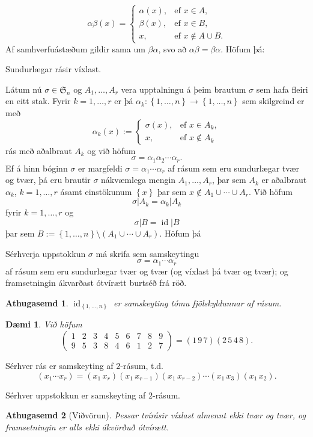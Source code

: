 \documentclass[a4paper,icelandic,11pt]{book}
\theoremstyle{plain}
\newtheorem{daemi}{Dæmi}[chapter]
\newtheorem*{ath}{Athugasemd}
\DeclareMathOperator{\id}{id} %
\begin{document}
\[
\alpha\beta(x) =\begin{cases}
  \alpha(x), & \text{ef } x\in A,\\
  \beta(x),  & \text{ef } x\in B,\\
  x,         & \text{ef } x\notin A\cup B.
\end{cases}
\]
Af samhverfuástæðum gildir sama um $\beta\alpha$, svo að
$\alpha\beta=\beta\alpha$. Höfum þá:
\begin{setn}
  Sundurlægar rásir víxlast.
\end{setn}
Látum nú $\sigma\in\mathfrak S_n$ og $A_1,\dots,A_r$ vera upptalningu á þeim
brautum $\sigma$ sem hafa fleiri en eitt stak. Fyrir $k=1,\dots,r$ er þá
$\alpha_k:\left\{ 1,\dots,n \right\}\to\left\{ 1,\dots,n \right\}$ sem
skilgreind er með 
\[
\alpha_k(x) :=\begin{cases}
  \sigma(x), & \text{ef } x\in A_k,\\
  x,         & \text{ef } x\notin A_k
\end{cases}
\]
rás með aðalbraut $A_k$ og við höfum
\[
\sigma = \alpha_1\alpha_2\cdots\alpha_r.
\]
Ef á hinn bóginn $\sigma$ er margfeldi $\sigma = \alpha_1\cdots\alpha_r$ af
rásum sem eru sundurlægar tvær og tvær, þá eru brautir $\sigma$ nákvæmlega
mengin $A_1,\dots,A_r$, þar sem $A_k$ er aðalbraut $\alpha_k$, $k=1,\dots,r$
ásamt einstökunum $\left\{ x \right\}$ þar sem $x\notin A_1\cup\cdots\cup A_r$.
Við höfum 
\[
\sigma | A_k = \alpha_k| A_k
\]
fyrir $k = 1,\dots,r$ og
\[
\sigma | B = \id | B
\]
þar sem $B:=\left\{ 1,\dots,n \right\}\setminus(A_1\cup\cdots\cup A_r)$. Höfum
þá
\begin{setn}
  Sérhverja uppstokkun $\sigma$ má skrifa sem samskeytingu
 \[
 \sigma = \alpha_1\cdots \alpha_r
 \]
 af rásum sem eru sundurlægar tvær og tvær (og víxlast þá tvær og tvær); og
 framsetningin ákvarðast ótvírætt burtséð frá röð.
\end{setn}
\begin{ath}
  $\id_{ \left\{ 1,\dots, n \right\}}$ er samskeyting \emph{tómu fjölskyldunnar}
  af rásum.
\end{ath}
\begin{daemi}
  Við höfum
  \[
  \begin{pmatrix}
    1 & 2 & 3 & 4 & 5 & 6 & 7 & 8 & 9 \\
    9 & 5 & 3 & 8 & 4 & 6 & 1 & 2 & 7
  \end{pmatrix}
  = (1\,9\,7)(2\,5\,4\,8).
  \]
\end{daemi}
\begin{setn}
  Sérhver rás er samskeyting af $2$-rásum, t.d.
 \[
 (x_1\cdots x_r) = (x_1\,x_r)(x_1\,x_{r-1})(x_1\,x_{r-2})\cdots
 (x_1\,x_3)(x_1\,x_2).
 \]
\end{setn}
\begin{setn}
  Sérhver uppstokkun er samskeyting af $2$-rásum.
\end{setn}
\begin{ath}
  [Viðvörun]
  Þessar tvírásir víxlast almennt ekki tvær og tvær, og framsetningin er alls
  ekki ákvörðuð ótvírætt.
\end{ath}
\end{document}
